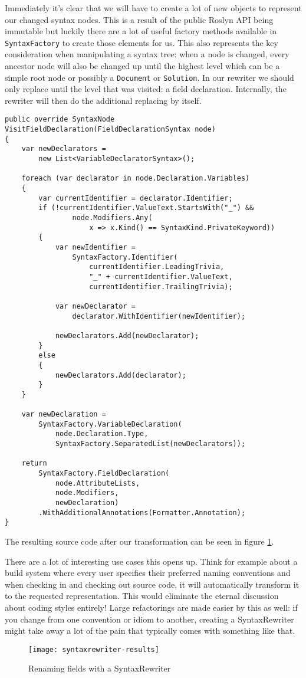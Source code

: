 Immediately it's clear that we will have to create a lot of new objects to represent our changed syntax nodes. This is a result of the public Roslyn API being immutable but luckily there are a lot of useful factory methods available in \texttt{SyntaxFactory} to create those elements for us. This also represents the key consideration when manipulating a syntax tree: when a node is changed, every ancestor node will also be changed up until the highest level which can be a simple root node or possibly a \texttt{Document} or \texttt{Solution}. In our rewriter we should only replace until the level that was visited: a field declaration. Internally, the rewriter will then do the additional replacing by itself.

\begin{lstlisting}[label={lst:syntaxrewriter-implementing-syntaxrewriter}]
public override SyntaxNode VisitFieldDeclaration(FieldDeclarationSyntax node)
{
	var newDeclarators = 
		new List<VariableDeclaratorSyntax>();

	foreach (var declarator in node.Declaration.Variables)
	{
		var currentIdentifier = declarator.Identifier;
		if (!currentIdentifier.ValueText.StartsWith("_") && 
				node.Modifiers.Any(
					x => x.Kind() == SyntaxKind.PrivateKeyword))
		{
			var newIdentifier = 
				SyntaxFactory.Identifier(
					currentIdentifier.LeadingTrivia, 
					"_" + currentIdentifier.ValueText, 
					currentIdentifier.TrailingTrivia);
					
			var newDeclarator = 
				declarator.WithIdentifier(newIdentifier);
				
			newDeclarators.Add(newDeclarator);
		}
		else
		{
			newDeclarators.Add(declarator);
		}
	}
	
	var newDeclaration = 
		SyntaxFactory.VariableDeclaration(
			node.Declaration.Type, 
			SyntaxFactory.SeparatedList(newDeclarators));
			
	return 
		SyntaxFactory.FieldDeclaration(
			node.AttributeLists, 
			node.Modifiers, 
			newDeclaration)
		.WithAdditionalAnnotations(Formatter.Annotation);
}
\end{lstlisting}


\noindent The resulting source code after our transformation can be seen in figure \ref{syntaxrewriter-results}.

There are a lot of interesting use cases this opens up. Think for example about a build system where every user specifies their preferred naming conventions and when checking in and checking out source code, it will automatically transform it to the requested representation. This would eliminate the eternal discussion about coding styles entirely! Large refactorings are made easier by this as well: if you change from one convention or idiom to another, creating a SyntaxRewriter might take away a lot of the pain that typically comes with something like that.

\begin{figure}[H]
\centering
\texttt{[image: syntaxrewriter-results]}
\caption[Renaming fields with a SyntaxRewriter]{Renaming fields with a SyntaxRewriter}
\label{syntaxrewriter-results}
\end{figure}